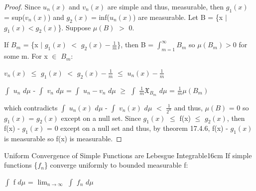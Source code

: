 \begin{proof}
        Since $u_n(x)$ and $v_n(x)$ are simple and thus, measurable,
        then $g_1(x)$ = sup($v_n(x)$) and $g_2(x)$ = inf($u_n(x)$)
        are measurable.
        Let B = \{x $|$ $g_1(x) < g_2(x)$\}. Suppose $\mu(B)$ $>$ 0.

        If $B_m$ = \{x $|$ $g_1(x)$ $<$ $g_2(x) - \frac{1}{m}$\},
        then B = $\int_{m=1}^{\infty} B_m$
        so $\mu(B_m) > 0$ for some m. For x $\in$ $B_m$:

        \hspace{0.5cm}
        $v_n(x)$
        $\leq$ $g_1(x)$
        $<$ $g_2(x) - \frac{1}{m}$
        $\leq$ $u_n(x) - \frac{1}{m}$

        \hspace{0.5cm}
        $\int$ $u_n$ $d\mu$ - $\int$ $v_n$ $d\mu$
        = $\int$ $u_n - v_n$ $d\mu$
        $\geq$ $\int$ $\frac{1}{m} \mathfrak{X}_{B_m}$ $d\mu$
        = $\frac{1}{m} \mu(B_m)$

        which contradicts
        $\int$ $u_n(x)$ $d\mu$ - $\int$ $v_n(x)$ $d\mu$ $<$ $\frac{1}{2^n}$
        and thus, $\mu(B)$ = 0
        so $g_1(x)$ = $g_2(x)$ except on a null set.
        Since $g_1(x)$ $\leq$ f(x) $\leq$ $g_2(x)$, then
        f(x) - $g_1(x)$ = 0 except on a null set and thus,
        by {\color{red} theorem 17.4.6}, f(x) - $g_1(x)$ is measurable
        so f(x) is measurable.
    \end{proof}

    \newpage



    \begin{wtheorem}{Uniform Convergence of Simple Functions are
    Lebesgue Integrable}{16cm}
        If simple functions \{$f_n$\} converge uniformly to bounded measurable f:

        \hspace{0.5cm}
        $\int$ f $d\mu$ = $\lim_{n \rightarrow \infty}$ $\int$ $f_n$ $d\mu$
    \end{wtheorem}

